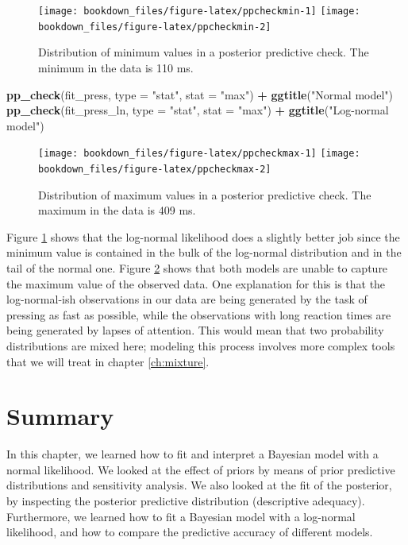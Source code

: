 \documentclass[12pt,]{krantz}
\newenvironment{Shaded}{\begin{snugshade}}{\end{snugshade}}
\newcommand{\DataTypeTok}[1]{\textcolor[rgb]{0.13,0.29,0.53}{#1}}
\newcommand{\KeywordTok}[1]{\textcolor[rgb]{0.13,0.29,0.53}{\textbf{#1}}}
\newcommand{\NormalTok}[1]{#1}
\newcommand{\OperatorTok}[1]{\textcolor[rgb]{0.81,0.36,0.00}{\textbf{#1}}}
\newcommand{\StringTok}[1]{\textcolor[rgb]{0.31,0.60,0.02}{#1}}
\theoremstyle{definition}
\theoremstyle{definition}
\theoremstyle{definition}
\theoremstyle{remark}
\begin{document}
\begin{figure}
\texttt{[image: bookdown\_files/figure-latex/ppcheckmin-1]} \texttt{[image: bookdown\_files/figure-latex/ppcheckmin-2]} \caption{Distribution of minimum values in a posterior predictive check. The minimum in the data is 110 ms.}\label{fig:ppcheckmin}
\end{figure}

\begin{Shaded}
\begin{Highlighting}[]
\KeywordTok{pp_check}\NormalTok{(fit_press, }\DataTypeTok{type =} \StringTok{"stat"}\NormalTok{, }\DataTypeTok{stat =} \StringTok{"max"}\NormalTok{) }\OperatorTok{+}\StringTok{ }\KeywordTok{ggtitle}\NormalTok{(}\StringTok{"Normal model"}\NormalTok{)}
\KeywordTok{pp_check}\NormalTok{(fit_press_ln, }\DataTypeTok{type =} \StringTok{"stat"}\NormalTok{, }\DataTypeTok{stat =} \StringTok{"max"}\NormalTok{) }\OperatorTok{+}\StringTok{ }\KeywordTok{ggtitle}\NormalTok{(}\StringTok{"Log-normal model"}\NormalTok{)}
\end{Highlighting}
\end{Shaded}

\begin{figure}
\texttt{[image: bookdown\_files/figure-latex/ppcheckmax-1]} \texttt{[image: bookdown\_files/figure-latex/ppcheckmax-2]} \caption{Distribution of maximum values in a posterior predictive check. The maximum in the data is 409 ms.}\label{fig:ppcheckmax}
\end{figure}

Figure \ref{fig:ppcheckmin} shows that the log-normal likelihood does a slightly better job since the minimum value is contained in the bulk of the log-normal distribution and in the tail of the normal one. Figure \ref{fig:ppcheckmax} shows that both models are unable to capture the maximum value of the observed data. One explanation for this is that the log-normal-ish observations in our data are being generated by the task of pressing as fast as possible, while the observations with long reaction times are being generated by lapses of attention.
This would mean that two probability distributions are mixed here; modeling this process involves more complex tools that we will treat in chapter \ref{ch:mixture}.

\hypertarget{summary}{%
\section{Summary}\label{summary}}

In this chapter, we learned how to fit and interpret a Bayesian model with a normal likelihood. We looked at the effect of priors by means of prior predictive distributions and sensitivity analysis. We also looked at the fit of the posterior, by inspecting the posterior predictive distribution (descriptive adequacy). Furthermore, we learned how to fit a Bayesian model with a log-normal likelihood, and how to compare the predictive accuracy of different models.
\end{document}
